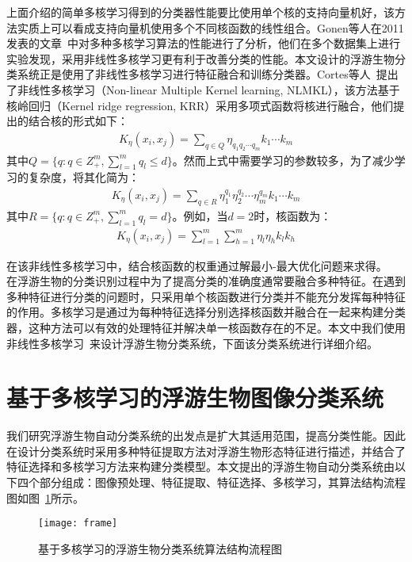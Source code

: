 上面介绍的简单多核学习得到的分类器性能要比使用单个核的支持向量机好，该方法实质上可以看成支持向量机使用多个不同核函数的线性组合。Gonen等人在2011发表的文章~\cite{gonen2011multiple}中对多种多核学习算法的性能进行了分析，他们在多个数据集上进行实验发现，采用非线性多核学习更有利于改善分类的性能。本文设计的浮游生物分类系统正是使用了非线性多核学习进行特征融合和训练分类器。Cortes等人~\cite{cortes2009learning}提出了非线性多核学习（Non-linear Multiple Kernel learning, NLMKL），该方法基于核岭回归（Kernel ridge regression, KRR）采用多项式函数将核进行融合，他们提出的结合核的形式如下：
\begin{eqnarray}
K_{\eta}(x_{i},x_{j})=\sum_{q\in Q}\eta_{q_{1}q_{2}\cdots q_{m}}k_{1}\cdots k_{m}
\end{eqnarray}
其中$Q=\{q:q\in Z^{m}_{+}, \sum^{m}_{l=1}q_{l}\le d\}$。然而上式中需要学习的参数较多，为了减少学习的复杂度，将其化简为：
\begin{eqnarray}
K_{\eta}(x_{i},x_{j})=\sum_{q\in R}\eta^{q_{1}}_{1}\eta^{q_{2}}_{2}\cdots\eta^{q_{m}}_{m}k_{1}\cdots k_{m}
\end{eqnarray}
其中$R=\{q:q\in Z^{m}_{+}, \sum^{m}_{l=1}q_{l}=d\}$。例如，当$d=2$时，核函数为：
\begin{eqnarray}
K_{\eta}(x_{i},x_{j})=\sum^{m}_{l=1}\sum^{m}_{h=1}\eta_{l}\eta_{h}k_{l}k_{h}
\end{eqnarray}

在该非线性多核学习中，结合核函数的权重通过解最小-最大优化问题来求得。\\


在浮游生物的分类识别过程中为了提高分类的准确度通常要融合多种特征。在遇到多种特征进行分类的问题时，只采用单个核函数进行分类并不能充分发挥每种特征的作用。多核学习是通过为每种特征选择分别选择核函数并融合在一起来构建分类器，这种方法可以有效的处理特征并解决单一核函数存在的不足。本文中我们使用非线性多核学习~\cite{cortes2009learning}来设计浮游生物分类系统，下面该分类系统进行详细介绍。

\section{基于多核学习的浮游生物图像分类系统}
\label{sec:system}

我们研究浮游生物自动分类系统的出发点是扩大其适用范围，提高分类性能。因此在设计分类系统时采用多种特征提取方法对浮游生物形态特征进行描述，并结合了特征选择和多核学习方法来构建分类模型。本文提出的浮游生物自动分类系统由以下四个部分组成：图像预处理、特征提取、特征选择、多核学习，其算法结构流程图如图~\ref{fig:frame}所示。
\begin{figure}[H] %
  \centering
  \texttt{[image: frame]}
  \caption{基于多核学习的浮游生物分类系统算法结构流程图}
  \label{fig:frame}
\end{figure}

